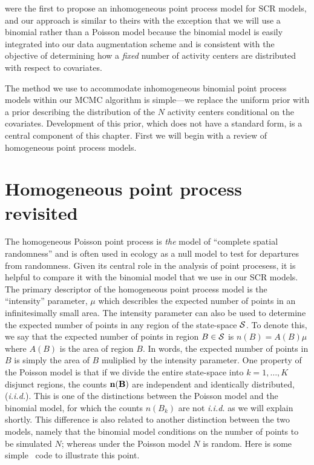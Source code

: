 \citet{borchers_efford:2008} were the first to propose an
inhomogeneous point process model for SCR models, and our approach is
similar to theirs with the exception that we will use a binomial
rather than a Poisson model because the binomial model is
easily integrated into our data augmentation scheme and is consistent
with the objective of determining how a {\it fixed} number of activity
centers are distributed with respect to covariates.

The method we use to accommodate inhomogeneous binomial point process
models within our MCMC algorithm is simple---we
replace the uniform prior with a prior describing the
distribution of the $N$ activity centers conditional on the
covariates. Development of this prior, which does not have a
standard form, is a central component of this chapter. First we will
begin with a review of homogeneous point process models.


\section{Homogeneous point process revisited}

The homogeneous Poisson point process is \emph{the} model of ``complete
spatial randomness'' and is often used in ecology as a null model
to test for departures from randomness. Given its central role in the
analysis of point procesess, it is helpful to compare it with
the binomial model that we use in our SCR models. The
primary descriptor of the homogeneous point process model is the
``intensity'' parameter, $\mu$ which describles the expected number
of points in an infinitesimally small area. The intensity
parameter can also be used to determine the expected number of points
in any region of the state-space $\cal{S}$. To denote this, we say
that the expected number of points in region $B \in \cal{S}$ is
$n(B) = A(B)\mu$ where $A(B)$ is the area of region $B$.  In words,
the expected number of points in $B$ is simply the area of $B$
muliplied by the intensity parameter. One property
of the Poisson model is that if we divide the entire state-space into
$k=1,\dots,K$ disjunct regions, the counts $\bf n(B)$ are
independent and identically distributed, ({\it i.i.d.}). This is one
of the distinctions between the Poisson model and the binomial model,
for which the counts $n(B_k)$ are not {\it i.i.d.} as we will explain
shortly. This difference is also related to another distinction
between the two models, namely that the binomial model
conditions on the number of points to be simulated $N$; whereas under
the Poisson model $N$ is random. Here is some simple \R~code to
illustrate this point.

